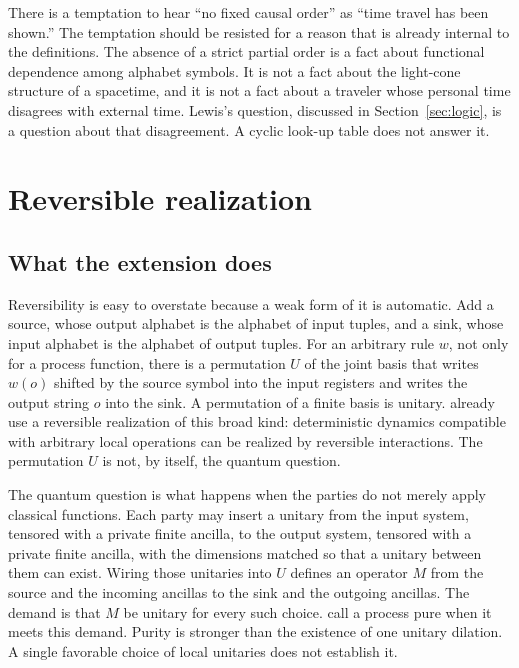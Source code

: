 \documentclass[11pt]{article}
\begin{document}
There is a temptation to hear ``no fixed causal order'' as ``time travel has been shown.'' The temptation should be resisted for a reason that is already internal to the definitions. The absence of a strict partial order is a fact about functional dependence among alphabet symbols. It is not a fact about the light-cone structure of a spacetime, and it is not a fact about a traveler whose personal time disagrees with external time. Lewis's question, discussed in Section~\ref{sec:logic}, is a question about that disagreement. A cyclic look-up table does not answer it.

\section{Reversible realization}
\label{sec:rev}

\subsection{What the extension does}
\label{sec:ext}

Reversibility is easy to overstate because a weak form of it is automatic. Add a source, whose output alphabet is the alphabet of input tuples, and a sink, whose input alphabet is the alphabet of output tuples. For an arbitrary rule \(w\), not only for a process function, there is a permutation \(U\) of the joint basis that writes \(w(o)\) shifted by the source symbol into the input registers and writes the output string \(o\) into the sink. A permutation of a finite basis is unitary. \citet{baumeler2019} already use a reversible realization of this broad kind: deterministic dynamics compatible with arbitrary local operations can be realized by reversible interactions. The permutation \(U\) is not, by itself, the quantum question.

The quantum question is what happens when the parties do not merely apply classical functions. Each party may insert a unitary from the input system, tensored with a private finite ancilla, to the output system, tensored with a private finite ancilla, with the dimensions matched so that a unitary between them can exist. Wiring those unitaries into \(U\) defines an operator \(M\) from the source and the incoming ancillas to the sink and the outgoing ancillas. The demand is that \(M\) be unitary for every such choice. \citet{araujo2017} call a process pure when it meets this demand. Purity is stronger than the existence of one unitary dilation. A single favorable choice of local unitaries does not establish it.
\end{document}
